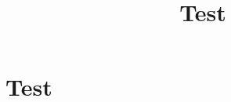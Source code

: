 \documentclass[12pt, a4paper, notitlepage, oneside]{article}
\begin{document}
\title{Test}
\date{}
\author{}
\maketitle

\section*{Test}
\end{document}

